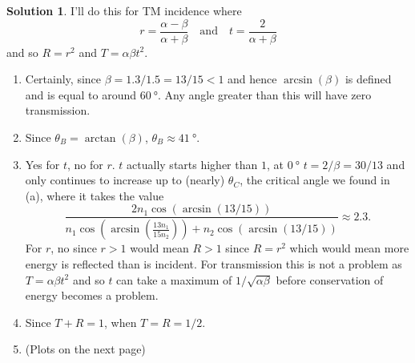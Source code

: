 \documentclass[10pt]{article}
\theoremstyle{definition}
\newtheorem{soln}{Solution}
\begin{document}
\begin{soln}
  I'll do this for TM incidence where
  $$r=\frac{\alpha-\beta}{\alpha+\beta}\quad\text{and}\quad t=\frac{2}{\alpha+\beta}$$
  and so $R=r^2$ and $T=\alpha\beta t^2$.
  \begin{enumerate}[label=(\alph*)]
    \item Certainly, since $\beta=1.3/1.5=13/15<1$ and hence $\arcsin(\beta)$ is defined and is equal to around $\qty{60}{\degree}$.
          Any angle greater than this will have zero transmission.
    \item Since $\theta_B=\arctan(\beta)$, $\theta_B\approx\qty{41}{\degree}$.
    \item Yes for $t$, no for $r$. $t$ actually starts higher than $1$, at $\qty{0}{\degree}$ $t=2/\beta=30/13$ and only continues to increase up to (nearly)
          $\theta_C$, the critical angle we found in (a), where it takes the value
          $$\frac{2n_1\cos(\arcsin(13/15))}{n_1\cos(\arcsin(\frac{13n_1}{15n_2}))+n_2\cos(\arcsin(13/15))}\approx 2.3.$$
          For $r$, no since $r>1$ would mean $R>1$ since $R=r^2$ which would mean more energy is reflected than is incident. For transmission this
          is not a problem as $T=\alpha\beta t^2$ and so $t$ can take a maximum of $1/\sqrt{\alpha \beta}$ before conservation of energy becomes a problem.
    \item Since $T+R=1$, when $T=R=1/2$.
    \item (Plots on the next page)
          \begin{figure}[h]
\end{figure}
\end{enumerate}
\end{soln}
\end{document}
